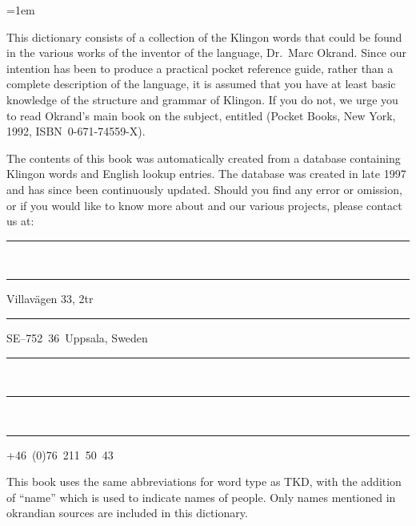%
%
%

\parindent=1em                                  %

\raggedbottom



\noindent This dictionary consists of a collection of the Klingon
words that could be found in the various works of the inventor of the
language, Dr.\ Marc Okrand. Since our intention has been to produce a
practical pocket reference guide, rather than a complete description
of the language, it is assumed that you have at least basic knowledge
of the structure and grammar of Klingon. If you do not, we urge you to
read Okrand's main book on the subject, entitled  (Pocket Books, New York, 1992, ISBN~0-671-74559-X).

The contents of this book was automatically created from a database
containing \fromkliwords{} Klingon words and \tokliwords{} English
lookup entries. The database was created in late 1997 and has since
been continuously updated. Should you find any error or omission, or
if you would like to know more about 
and our various projects, please contact us at:

\vspace{3mm}%
\noindent\parbox[t]{.5\textwidth}{%
  \rule{1cm}{0mm}\\
  \rule{1cm}{0mm}Villavägen 33, 2tr\\
  \rule{1cm}{0mm}SE--752~36~Uppsala, Sweden%
}%
\parbox[t]{.5\textwidth}{%
  \rule{1cm}{0mm}\\
  \rule{1cm}{0mm}\\
  \rule{1cm}{0mm}+46~(0)76~211~50~43%
}



\noindent This book uses the same abbreviations for word type as TKD, with the
addition of ``name'' which is used to indicate names of people. Only names
mentioned in okrandian sources are included in this dictionary.

